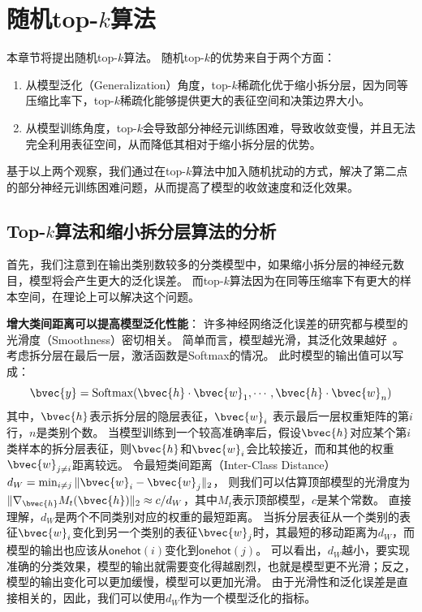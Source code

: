 \section{随机top-$k$算法}
\label{sec:randomized_topk:method}
本章节将提出随机top-$k$算法。
%
随机top-$k$的优势来自于两个方面：
\begin{enumerate}
    \item 从模型泛化（Generalization）角度，top-$k$稀疏化优于缩小拆分层，因为同等压缩比率下，top-$k$稀疏化能够提供更大的表征空间和决策边界大小。
    \item 从模型训练角度，top-$k$会导致部分神经元训练困难，导致收敛变慢，并且无法完全利用表征空间，从而降低其相对于缩小拆分层的优势。
\end{enumerate}
%
基于以上两个观察，我们通过在top-$k$算法中加入随机扰动的方式，解决了第二点的部分神经元训练困难问题，从而提高了模型的收敛速度和泛化效果。
%

\subsection{Top-$k$算法和缩小拆分层算法的分析}
首先，我们注意到在输出类别数较多的分类模型中，如果缩小拆分层的神经元数目，模型将会产生更大的泛化误差。
而top-$k$算法因为在同等压缩率下有更大的样本空间，在理论上可以解决这个问题。


\textbf{增大类间距离可以提高模型泛化性能}：
许多神经网络泛化误差的研究都与模型的光滑度（Smoothness）密切相关。
%
简单而言，模型越光滑，其泛化效果越好~\cite{neysharbur2015norm_capacity,neysharbur2017generalization,gouk2021lipschitz_reg}。
%
考虑拆分层在最后一层，激活函数是Softmax的情况。
此时模型的输出值可以写成：
\begin{equation}
    \bvec{y} = \text{Softmax}(\bvec{h}\cdot \bvec{w}_1, \cdots, \bvec{h} \cdot \bvec{w}_n)
\end{equation}
其中，$\bvec{h}$表示拆分层的隐层表征，$\bvec{w}_i$ 表示最后一层权重矩阵的第$i$行，$n$是类别个数。
%
当模型训练到一个较高准确率后，假设$\bvec{h}$对应某个第$i$类样本的拆分层表征，则$\bvec{h}$和$\bvec{w}_i$会比较接近，而和其他的权重$\bvec{w}_{j\ne i}$距离较远。
%
令最短类间距离（Inter-Class Distance）$d_W = \min_{i\ne j} \Vert \bvec{w}_i - \bvec{w}_j \Vert_2$，
则我们可以估算顶部模型的光滑度为$\Vert \nabla_{\bvec{h}} M_t(\bvec{h}) \Vert_2 \approx c/d_W$，其中$M_t$表示顶部模型，$c$是某个常数。
%
直接理解，$d_W$是两个不同类别对应的权重的最短距离。
当拆分层表征从一个类别的表征$\bvec{w}_i$变化到另一个类别的表征$\bvec{w}_j$时，其最短的移动距离为$d_W$，而模型的输出也应该从$\mathsf{onehot}(i)$变化到$\mathsf{onehot}(j)$。
%
可以看出，$d_W$越小，要实现准确的分类效果，模型的输出就需要变化得越剧烈，也就是模型更不光滑；反之，模型的输出变化可以更加缓慢，模型可以更加光滑。
%
由于光滑性和泛化误差是直接相关的，因此，我们可以使用$d_W$作为一个模型泛化的指标。
%


